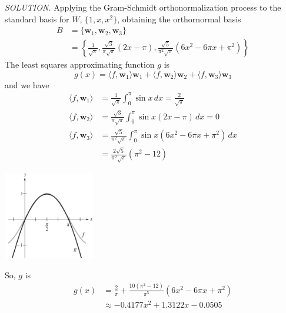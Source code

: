 \documentclass{article}
\newcommand\B{\textbf}
\newcommand\la{\langle}
\newcommand\ra{\rangle}
\newcommand\ddfrac[2]{\frac{\displaystyle #1}{\displaystyle #2}}
\begin{document}
    \textit{ \textcolor{blue5}{SOLUTION.} } Applying the Gram-Schmidt orthonormalization process to the standard
    basis for $W$, $\{1, x, x^2 \}$, obtaining the orthornormal basis
    \begin{equation*}
        \begin{split}
            B &= \{ \B{w}_1, \B{w}_2, \B{w}_3 \}\\
              &= \left\{ \ddfrac{1}{\sqrt{\pi}}, \ddfrac{\sqrt{3}}{\pi\sqrt{\pi}}(2x - \pi), \ddfrac{\sqrt{5}}{\pi^2\sqrt{\pi}}(6x^2 - 6\pi x + \pi^2) \right\}
        \end{split}
    \end{equation*}
    The least squares approximating function $g$ is 
    \[g(x) = \la f, \B{w}_1 \ra \B{w}_1 + \la f, \B{w}_2 \ra \B{w}_2 + \la f, \B{w}_3 \ra \B{w}_3 \]
    and we have
    \begin{equation*}
        \begin{split}
            \la f, \B{w}_1 \ra &= \ddfrac{1}{\sqrt{\pi}} \int_0^\pi \sin{x}\,dx = \ddfrac{2}{\sqrt{\pi}} \\
            \la f, \B{w}_2 \ra &= \ddfrac{\sqrt{3}}{\pi\sqrt{\pi}} \int_0^\pi \sin{x}(2x - \pi)\,dx = 0 \\
            \la f, \B{w}_3 \ra &= \ddfrac{\sqrt{5}}{\pi^2\sqrt{\pi}}\int_0^\pi \sin{x}(6x^2 - 6\pi x + \pi^2)\,dx \\
                              &= \ddfrac{2\sqrt{5}}{\pi^2\sqrt{\pi}}(\pi^2 - 12)
        \end{split}
    \end{equation*}
    \begin{minipage}{0.3\linewidth}
        \includegraphics[width = 4cm]{images/integ6.png}
    \end{minipage}
    \begin{minipage}{0.6\linewidth}
        So, $g$ is
        \begin{equation*}
            \begin{split}
                g(x) &= \ddfrac{2}{\pi} + \ddfrac{10(\pi^2 - 12)}{\pi^5}(6x^2 - 6\pi x + \pi^2) \\
                     &\approx -0.4177x^2 + 1.3122x - 0.0505
            \end{split}
        \end{equation*}
    \end{minipage}
\end{document}
